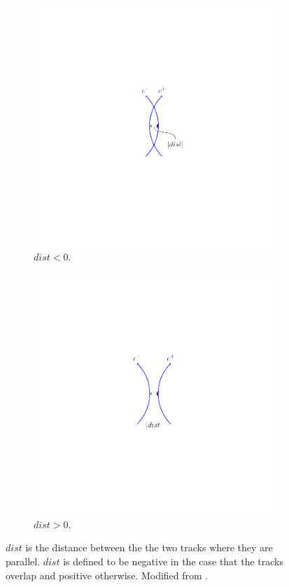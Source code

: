 \begin{figure}[htbp]
  \centering
  \begin{subfigure}{0.45\textwidth}
    \centering
    \includegraphics[trim = 40mm 40mm 40mm 40mm, clip,width=\textwidth]{dist_m}
    \caption{$dist<0$.}
    \label{fig:dist_m}
  \end{subfigure}
  \begin{subfigure}{0.45\textwidth}
    \centering
    \includegraphics[trim = 40mm 40mm 40mm 40mm, clip,width=\textwidth]{dist_p}
    \caption{$dist>0$.}
    \label{fig:dist_p}
  \end{subfigure}
  \caption{$dist$ is the distance between the the two tracks where they are
parallel. $dist$ is defined to be negative in the case that the tracks overlap
and positive otherwise. Modified from \cite{barge2009conversion}. } 
\label{fig:dist}
\end{figure}
